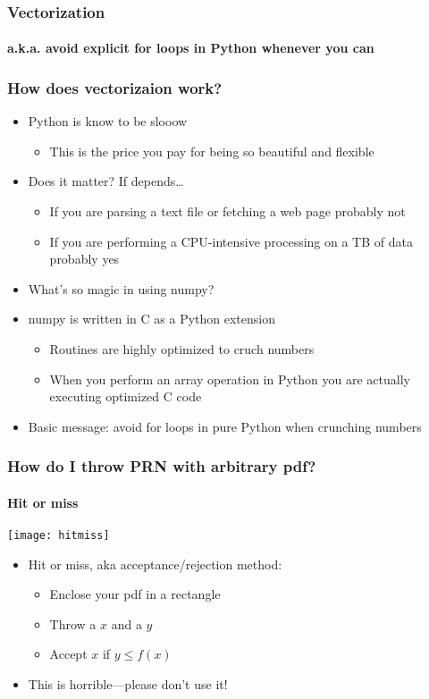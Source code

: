 \documentclass[9pt]{beamer}
\begin{document}
\begin{frame}
  \frametitle{Vectorization}
  \framesubtitle{a.k.a. avoid explicit for loops in Python whenever you can}
  
\end{frame}


\begin{frame}
  \frametitle{How does vectorizaion work?}
  \begin{itemize}
  \item Python is know to be slooow
    \begin{itemize}
    \item This is the price you pay for being so beautiful and flexible
    \end{itemize}
  \item Does it matter? If depends\ldots
    \begin{itemize}
    \item If you are parsing a text file or fetching a web page probably not
    \item If you are performing a CPU-intensive processing on a TB of data
      probably yes
    \end{itemize}
  \item What's so magic in using numpy?
  \item numpy is written in C as a Python extension
    \begin{itemize}
    \item Routines are highly optimized to cruch numbers
    \item When you perform an array operation in Python you are actually
      executing optimized C code
    \end{itemize}
  \item \alert{Basic message: avoid for loops in pure Python when
    crunching numbers}
  \end{itemize}
\end{frame}


\begin{frame}
  \frametitle{How do I throw PRN with arbitrary pdf?}
  \framesubtitle{Hit or miss}
  \centering\texttt{[image: hitmiss]}

  \begin{itemize}
  \item Hit or miss, aka acceptance/rejection method:
    \begin{itemize}
    \item Enclose your pdf in a rectangle
    \item Throw a $x$ and a $y$
    \item Accept $x$ if $y \leq f(x)$
    \end{itemize}
  \item \alert{This is horrible---please don't use it!}
  \end{itemize}
\end{frame}
\end{document}
